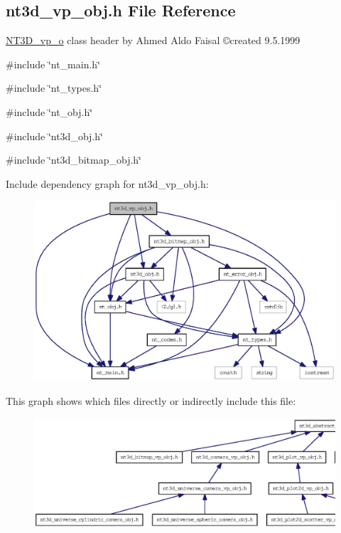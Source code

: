 \subsection{nt3d\_\-vp\_\-obj.h File Reference}
\label{nt3d__vp__obj_8h}



\begin{DoxyItemize}
\item \hyperlink{class_n_t3_d__vp__o}{NT3D\_\-vp\_\-o} class header by Ahmed Aldo Faisal \copyright created 9.5.1999 
\end{DoxyItemize} 


{\ttfamily \#include \char`\"{}nt\_\-main.h\char`\"{}}\par
{\ttfamily \#include \char`\"{}nt\_\-types.h\char`\"{}}\par
{\ttfamily \#include \char`\"{}nt\_\-obj.h\char`\"{}}\par
{\ttfamily \#include \char`\"{}nt3d\_\-obj.h\char`\"{}}\par
{\ttfamily \#include \char`\"{}nt3d\_\-bitmap\_\-obj.h\char`\"{}}\par
Include dependency graph for nt3d\_\-vp\_\-obj.h:
\nopagebreak
\begin{figure}[H]
\begin{center}
\leavevmode
\includegraphics[width=400pt]{nt3d__vp__obj_8h__incl}
\end{center}
\end{figure}
This graph shows which files directly or indirectly include this file:
\nopagebreak
\begin{figure}[H]
\begin{center}
\leavevmode
\includegraphics[width=400pt]{nt3d__vp__obj_8h__dep__incl}
\end{center}
\end{figure}
